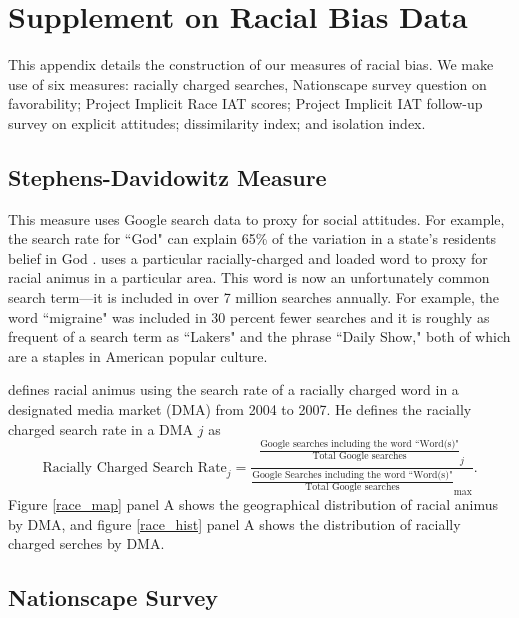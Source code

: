 \documentclass[11pt]{article}
\begin{document}

\section{Supplement on Racial Bias Data}\label{a_racialbias}

This appendix details the construction of our measures of racial bias. We make use of six measures: racially charged searches, Nationscape survey question on favorability; Project Implicit Race IAT scores; Project Implicit IAT follow-up survey on explicit attitudes; dissimilarity index; and isolation index.

\subsection{Stephens-Davidowitz Measure}

This measure uses Google search data to proxy for social attitudes. For example, the search rate for ``God" can explain 65\% of the variation in a state's residents belief in God \citet{stephens2013cost}. \cite{stephens2013cost} uses a particular racially-charged and loaded word to proxy for racial animus in a particular area. This word is now an unfortunately common search term---it is included in over 7 million searches annually. For example, the word ``migraine" was included in 30 percent fewer searches and it is roughly as frequent of a search term as ``Lakers" and the phrase ``Daily Show," both of which are a staples in American popular culture. 

\cite{stephens2013cost} defines racial animus using the search rate of a racially charged word in a designated media market (DMA) from 2004 to 2007. He defines the racially charged search rate in a DMA $j$ as
\begin{equation}
 	\text{Racially Charged Search Rate}_j = \frac{\frac{\text{Google searches including the word ``Word(s)"}}{\text{Total Google searches}}_j}{\frac{\text{Google Searches including the word ``Word(s)"}}{\text{Total Google searches}}_{\max}}. 
 \end{equation}
 \noindent Figure \ref{race_map} panel A shows the geographical distribution of racial animus by DMA, and figure \ref{race_hist} panel A shows the distribution of racially charged serches by DMA. 

\subsection{Nationscape Survey}
\end{document}

